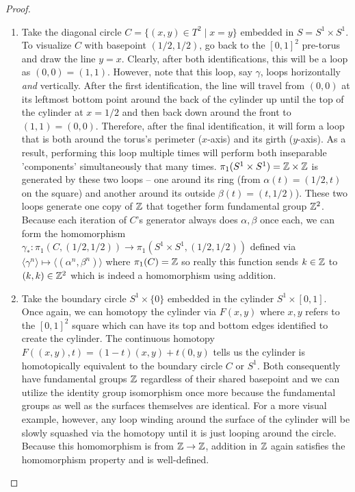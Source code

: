 \begin{proof}
\begin{enumerate}[label = (\alph*)]
        \item Take the diagonal circle $C = \{(x,y) \in T^2 \mid x=y\}$ embedded in $S = S^1\times S^1$. To visualize $C$ with basepoint $(1/2,1/2)$, go back to the $[0,1]^2$ pre-torus and draw the line $y = x.$ Clearly, after both identifications, this will be a loop as $(0,0) = (1,1).$ However, note that this loop, say $\gamma$, loops horizontally \emph{and} vertically. After the first identification, the line will travel from $(0,0)$ at its leftmost bottom point around the back of the cylinder up until the top of the cylinder at $x=1/2$ and then back down around the front to $(1,1) = (0,0)$. Therefore, after the final identification, it will form a loop that is both around the torus's perimeter ($x$-axis) and its girth ($y$-axis). As a result, performing this loop multiple times will perform both inseparable 'components' simultaneously that many times. $\pi_1(S^1 \times S^1) = \mathbb{Z}\times\mathbb{Z}$ is generated by these two loops – one around its ring (from $\alpha(t) = (1/2,t)$ on the square) and another around its outside $\beta(t) = (t, 1/2)$). These two loops generate one copy of $\mathbb{Z}$ that together form fundamental group $\mathbb{Z}^2$. Because each iteration of $C$'s generator always does $\alpha, \beta$ once each, we can form the homomorphism $\gamma_*\colon\pi_1(C,(1/2,1/2))\to\pi_1(S^1\times S^1,(1/2,1/2))$ defined via $\langle \gamma^n \rangle \mapsto \langle(\alpha^n, \beta^n) \rangle$ where $\pi_1(C) = \mathbb{Z}$ so really this function sends $k \in \mathbb{Z}$ to $(k,k) \in \mathbb{Z}^2$ which is indeed a homomorphism using addition.

        \item Take the boundary circle $S^{1}\times\{0\}$ embedded in the cylinder $S^1 \times [0,1]$. Once again, we can homotopy the cylinder via $F(x,y)$ where $x,y$ refers to the $[0,1]^2$ square which can have its top and bottom edges identified to create the cylinder. The continuous homotopy $F((x,y),t) = (1-t)(x,y) + t(0,y)$ tells us the cylinder is homotopically equivalent to the boundary circle $C$ or $S^1$. Both consequently have fundamental groups $\mathbb{Z}$ regardless of their shared basepoint and we can utilize the identity group isomorphism once more because the fundamental groups as well as the surfaces themselves are identical. For a more visual example, however, any loop winding around the surface of the cylinder will be slowly squashed via the homotopy until it is just looping around the circle. Because this homomorphism is from $\mathbb{Z}\to\mathbb{Z}$, addition in $\mathbb{Z}$ again satisfies the homomorphism property and is well-defined.
    \end{enumerate}
\end{proof}

